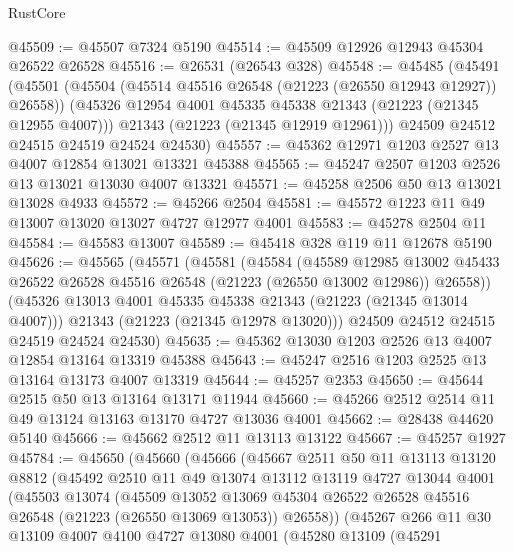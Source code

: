 \begin{lexlean}{RustCore}
\begin{coremodule}
@45509 := @45507 @7324 @5190
@45514 := @45509 @12926 @12943 @45304 @26522 @26528
@45516 := @26531 (@26543 @328)
@45548 := @45485
    (@45491
      (@45501
        (@45504 (@45514 @45516 @26548 (@21223 (@26550 @12943 @12927)) @26558))
        (@45326 @12954 @4001 @45335 @45338 @21343 (@21223 (@21345 @12955 @4007)))
        @21343
        (@21223 (@21345 @12919 @12961)))
      @24509
      @24512
      @24515
      @24519
      @24524
      @24530)
@45557 := @45362 @12971 @1203 @2527 @13 @4007 @12854 @13021 @13321 @45388
@45565 := @45247 @2507 @1203 @2526 @13 @13021 @13030 @4007 @13321
@45571 := @45258 @2506 @50 @13 @13021 @13028 @4933
@45572 := @45266 @2504
@45581 := @45572 @1223 @11 @49 @13007 @13020 @13027 @4727 @12977 @4001
@45583 := @45278 @2504 @11
@45584 := @45583 @13007
@45589 := @45418 @328 @119 @11 @12678 @5190
@45626 := @45565
    (@45571
      (@45581
        (@45584
          (@45589
            @12985
            @13002
            @45433
            @26522
            @26528
            @45516
            @26548
            (@21223 (@26550 @13002 @12986))
            @26558))
        (@45326 @13013 @4001 @45335 @45338 @21343 (@21223 (@21345 @13014 @4007)))
        @21343
        (@21223 (@21345 @12978 @13020)))
      @24509
      @24512
      @24515
      @24519
      @24524
      @24530)
@45635 := @45362 @13030 @1203 @2526 @13 @4007 @12854 @13164 @13319 @45388
@45643 := @45247 @2516 @1203 @2525 @13 @13164 @13173 @4007 @13319
@45644 := @45257 @2353
@45650 := @45644 @2515 @50 @13 @13164 @13171 @11944
@45660 := @45266 @2512 @2514 @11 @49 @13124 @13163 @13170 @4727 @13036 @4001
@45662 := @28438 @44620 @5140
@45666 := @45662 @2512 @11 @13113 @13122
@45667 := @45257 @1927
@45784 := @45650
    (@45660
      (@45666
        (@45667
          @2511
          @50
          @11
          @13113
          @13120
          @8812
          (@45492
            @2510
            @11
            @49
            @13074
            @13112
            @13119
            @4727
            @13044
            @4001
            (@45503
              @13074
              (@45509
                @13052
                @13069
                @45304
                @26522
                @26528
                @45516
                @26548
                (@21223 (@26550 @13069 @13053))
                @26558))
            (@45267
              @266
              @11
              @30
              @13109
              @4007
              @4100
              @4727
              @13080
              @4001
              (@45280
                @13109
                (@45291

\end{coremodule}
\end{lexlean}
